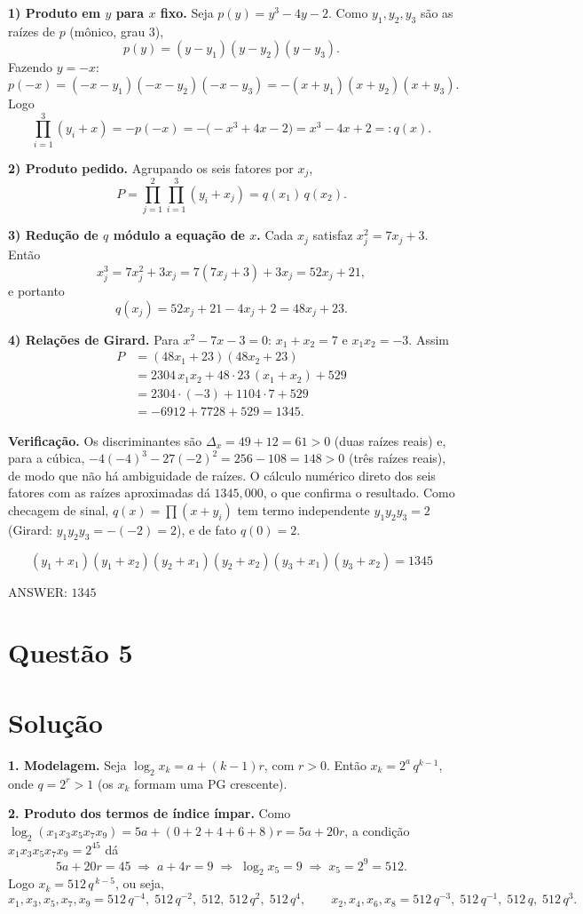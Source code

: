 \documentclass{article}%
\begin{document}
\medskip
\textbf{1) Produto em $y$ para $x$ fixo.} Seja $p(y)=y^3-4y-2$. Como $y_1,y_2,y_3$ são as raízes de $p$ (mônico, grau 3),
\[
p(y)=(y-y_1)(y-y_2)(y-y_3).
\]
Fazendo $y=-x$:
\[
p(-x)=(-x-y_1)(-x-y_2)(-x-y_3)=-(x+y_1)(x+y_2)(x+y_3).
\]
Logo
\[
\prod_{i=1}^{3}(y_i+x)=-p(-x)=-\bigl(-x^3+4x-2\bigr)=x^3-4x+2=:q(x).
\]

\textbf{2) Produto pedido.} Agrupando os seis fatores por $x_j$,
\[
P=\prod_{j=1}^{2}\prod_{i=1}^{3}(y_i+x_j)=q(x_1)\,q(x_2).
\]

\textbf{3) Redução de $q$ módulo a equação de $x$.} Cada $x_j$ satisfaz $x_j^2=7x_j+3$. Então
\[
x_j^3=7x_j^2+3x_j=7(7x_j+3)+3x_j=52x_j+21,
\]
e portanto
\[
q(x_j)=52x_j+21-4x_j+2=48x_j+23 .
\]

\textbf{4) Relações de Girard.} Para $x^2-7x-3=0$: $x_1+x_2=7$ e $x_1x_2=-3$. Assim
\begin{align*}
P&=(48x_1+23)(48x_2+23)\\
&=2304\,x_1x_2+48\cdot 23\,(x_1+x_2)+529\\
&=2304\cdot(-3)+1104\cdot 7+529\\
&=-6912+7728+529=1345 .
\end{align*}

\textbf{Verificação.} Os discriminantes são $\Delta_x=49+12=61>0$ (duas raízes reais) e, para a cúbica, $-4(-4)^3-27(-2)^2=256-108=148>0$ (três raízes reais), de modo que não há ambiguidade de raízes. O cálculo numérico direto dos seis fatores com as raízes aproximadas dá $1345{,}000$, o que confirma o resultado. Como checagem de sinal, $q(x)=\prod(x+y_i)$ tem termo independente $y_1y_2y_3=2$ (Girard: $y_1y_2y_3=-(-2)=2$), e de fato $q(0)=2$.

\[
\boxed{(y_1+x_1)(y_1+x_2)(y_2+x_1)(y_2+x_2)(y_3+x_1)(y_3+x_2)=1345}
\]

ANSWER: $1345$%
\newpage%
\section*{Questão 5}

\section*{Solução}

\textbf{1. Modelagem.} Seja $\log_2 x_k = a + (k-1)r$, com $r>0$. Então $x_k = 2^{a}\,q^{k-1}$, onde $q = 2^{r} > 1$ (os $x_k$ formam uma PG crescente).

\textbf{2. Produto dos termos de índice ímpar.} Como $\log_2(x_1x_3x_5x_7x_9) = 5a + (0+2+4+6+8)r = 5a+20r$, a condição $x_1x_3x_5x_7x_9 = 2^{45}$ dá
\[
5a+20r = 45 \;\Longrightarrow\; a+4r = 9 \;\Longrightarrow\; \log_2 x_5 = 9 \;\Longrightarrow\; x_5 = 2^9 = 512 .
\]
Logo $x_k = 512\,q^{\,k-5}$, ou seja,
\[
x_1,x_3,x_5,x_7,x_9 = 512\,q^{-4},\;512\,q^{-2},\;512,\;512\,q^{2},\;512\,q^{4},
\qquad
x_2,x_4,x_6,x_8 = 512\,q^{-3},\;512\,q^{-1},\;512\,q,\;512\,q^{3}.
\]
\end{document}
